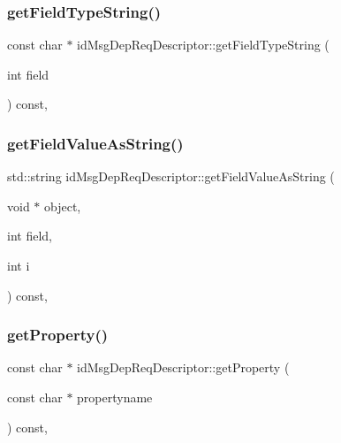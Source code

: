 \subsubsection{\texorpdfstring{get\+Field\+Type\+String()}{getFieldTypeString()}}
{\footnotesize\ttfamily const char $\ast$ id\+Msg\+Dep\+Req\+Descriptor\+::get\+Field\+Type\+String (\begin{DoxyParamCaption}\item[{int}]{field }\end{DoxyParamCaption}) const\hspace{0.3cm}{\ttfamily [override]}, {\ttfamily [virtual]}}

\mbox{\label{classid_msg_dep_req_descriptor_a01154250296e827bb3b46ffd9356d403}} 
\subsubsection{\texorpdfstring{get\+Field\+Value\+As\+String()}{getFieldValueAsString()}}
{\footnotesize\ttfamily std\+::string id\+Msg\+Dep\+Req\+Descriptor\+::get\+Field\+Value\+As\+String (\begin{DoxyParamCaption}\item[{void $\ast$}]{object,  }\item[{int}]{field,  }\item[{int}]{i }\end{DoxyParamCaption}) const\hspace{0.3cm}{\ttfamily [override]}, {\ttfamily [virtual]}}

\mbox{\label{classid_msg_dep_req_descriptor_a389f447ccbaba22709ec52b3ed5438f7}} 
\subsubsection{\texorpdfstring{get\+Property()}{getProperty()}}
{\footnotesize\ttfamily const char $\ast$ id\+Msg\+Dep\+Req\+Descriptor\+::get\+Property (\begin{DoxyParamCaption}\item[{const char $\ast$}]{propertyname }\end{DoxyParamCaption}) const\hspace{0.3cm}{\ttfamily [override]}, {\ttfamily [virtual]}}

